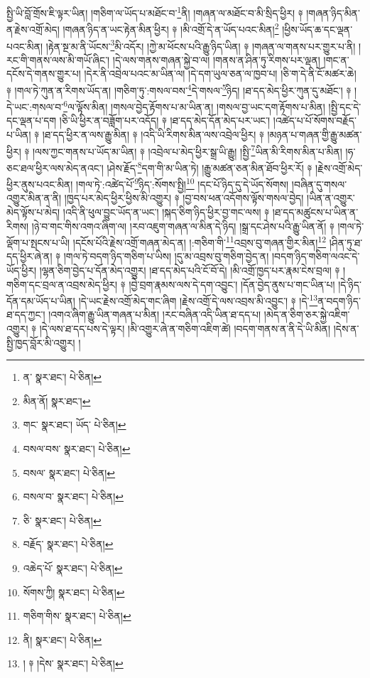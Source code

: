 སྤྱི་ཡི་བློ་གྲོས་ཇི་ལྟར་ཡིན། །གཅིག་ལ་ཡོད་པ་མཐོང་བ་\footnote{ན་  སྣར་ཐང་།  པེ་ཅིན། }ནི། །གཞན་ལ་མཐོང་བ་མི་སྲིད་ཕྱིར། ༈ །གཞན་ཉིད་མིན་ན་རྗེས་འགྲོ་མེད། །གཞན་ཉིད་ན་ཡང་རྟེན་མིན་ཕྱིར། ༈ །མི་འགྲོ་དེ་ན་ཡོད་པའང་མིན།\footnote{མིན་ནོ།  སྣར་ཐང་། } །ཕྱིས་ཡོད་ཆ་དང་ལྡན་པའང་མིན། །རྟེན་སྔ་མ་ནི་ཡོངས་\footnote{གང་  སྣར་ཐང་། ཡོད་  པེ་ཅིན། }མི་འདོར། །ཀྱེ་མ་ཕོངས་པའི་རྒྱུ་ཉིད་ཡིན། ༈ །གཞན་ལ་གནས་པར་གྱུར་པ་ནི། །རང་གི་གནས་ལས་མི་གཡོ་ཞིང་། །དེ་ལས་གནས་གཞན་སྐྱེ་བ་ལ། །གནས་ན་ཤིན་ཏུ་རིགས་པར་ལྡན། །གང་ན་དངོས་དེ་གནས་གྱུར་པ། །དེར་ནི་འབྲེལ་པའང་མ་ཡིན་ལ། །དེ་དག་ཡུལ་ཅན་ལ་ཁྱབ་པ། །ཅི་ག་དེ་ནི་ངོ་མཚར་ཆེ། ༈ །གལ་ཏེ་ཀུན་ན་རིགས་ཡོད་ན། །གཅིག་ཏུ་:གསལ་བས་\footnote{བསལ་བས་  སྣར་ཐང་།  པེ་ཅིན། }དེ་གསལ་\footnote{བསལ་  སྣར་ཐང་།  པེ་ཅིན། }ཉིད། །ཐ་དད་མེད་ཕྱིར་ཀུན་དུ་མཐོང་། ༈ །དེ་ཡང་:གསལ་བ་\footnote{བསལ་བ་  སྣར་ཐང་།  པེ་ཅིན། }ལ་ལྟོས་མིན། །གསལ་བྱེད་རྟོགས་པ་མ་ཡིན་ན། །གསལ་བྱ་ཡང་དག་རྟོགས་པ་མིན། །སྤྱི་དང་དེ་དང་ལྡན་པ་དག །ཅི་ཡི་ཕྱིར་ན་བཟློག་པར་འདོད། ༈ །ཐ་དད་མེད་དོན་མེད་པར་ཡང་། །འཚེད་པ་པོ་སོགས་བརྗོད་པ་ཡིན། ༈ །ཐ་དད་ཕྱིར་ན་ལས་རྒྱུ་མིན། ༈ །འདི་ཡི་རིགས་མིན་ལས་འབྲེལ་ཕྱིར། ༈ །མཉན་པ་གཞན་གྱི་རྒྱུ་མཚན་ཕྱིར། ༈ །ལས་ཀྱང་གནས་པ་ཡོད་མ་ཡིན། ༈ །འབྲེལ་པ་མེད་ཕྱིར་སྒྲ་ཡི་རྒྱུ། །སྤྱི་\footnote{ཅི་  སྣར་ཐང་།  པེ་ཅིན། }ཡིན་མི་རིགས་མིན་པ་མིན། །ཧ་ཅང་ཐལ་ཕྱིར་ལས་མེད་ནའང་། །ཤེས་རྗོད་\footnote{བརྗོད་  སྣར་ཐང་།  པེ་ཅིན། }དག་གི་མ་ཡིན་ཏེ། །རྒྱུ་མཚན་ཅན་མིན་ཐོབ་ཕྱིར་རོ། ༈ །རྗེས་འགྲོ་མེད་ཕྱིར་ནུས་པའང་མིན། །གལ་ཏེ་:འཚེད་པོ་\footnote{འཆེད་པོ་  སྣར་ཐང་།  པེ་ཅིན། }ཉིད་:སོགས་སྤྱི།\footnote{སོགས་ཀྱི།  སྣར་ཐང་།  པེ་ཅིན། } །དང་པོ་ཉིད་དུ་དེ་ཡོད་སོགས། །བཞིན་དུ་གསལ་འགྱུར་མིན་ན་ནི། །ཁྱད་པར་མེད་ཕྱིར་ཕྱིས་མི་འགྱུར། ༈ །བྱ་བས་ཕན་འདོགས་ལྟོས་གསལ་བྱེད། །ཡིན་ན་འགྱུར་མེད་ལྟོས་པ་མེད། །འདི་ནི་ཕུལ་བྱུང་ཡོད་ན་ཡང་། །སྐད་ཅིག་ཉིད་ཕྱིར་བྱ་གང་ལས། ༈ །ཐ་དད་མཚུངས་པ་ཡིན་ན་རིགས། །ཉེ་བ་གང་གིས་འགའ་ཞིག་ལ། །རབ་འཇུག་གཞན་ལ་མིན་དེ་ཉིད། །སྒྲ་དང་ཤེས་པའི་རྒྱུ་ཡིན་ནོ། ༈ །གལ་ཏེ་ལྡོག་པ་སྤངས་པ་ཡི། །དངོས་པོའི་རྗེས་འགྲོ་གཞན་མེད་ན། །:གཅིག་གི་\footnote{གཅིག་གིས་  སྣར་ཐང་།  པེ་ཅིན། }འབྲས་བུ་གཞན་གྱིར་མིན།\footnote{ནི།  སྣར་ཐང་།  པེ་ཅིན། } །ཤིན་ཏུ་ཐ་དད་ཕྱིར་ཞེ་ན། ༈ །གལ་ཏེ་བདག་ཉིད་གཅིག་པ་ཡིས། །དུ་མ་འབྲས་བུ་གཅིག་བྱེད་ན། །བདག་ཉིད་གཅིག་ལའང་དེ་ཡོད་ཕྱིར། །ལྷན་ཅིག་བྱེད་པ་དོན་མེད་འགྱུར། །ཐ་དད་མེད་པའི་ངོ་བོ་དེ། །མི་འགྲོ་ཁྱད་པར་རྣམ་ངེས་བྲལ། ༈ །གཅིག་དང་བྲལ་ན་འབྲས་མེད་ཕྱིར། ༈ །བྱེ་བྲག་རྣམས་ལས་དེ་དག་འབྱུང་། །དོན་བྱེད་ནུས་པ་གང་ཡིན་པ། །དེ་ཉིད་དོན་དམ་ཡོད་པ་ཡིན། །དེ་ཡང་རྗེས་འགྲོ་མེད་གང་ཞིག །རྗེས་འགྲོ་དེ་ལས་འབྲས་མི་འབྱུང་། ༈ །དེ་\footnote{། ༈ །དེས་  སྣར་ཐང་།  པེ་ཅིན། }ན་བདག་ཉིད་ཐ་དད་ཀྱང་། །འགའ་ཞིག་རྒྱུ་ཡིན་གཞན་པ་མིན། །རང་བཞིན་འདི་ཡིན་ཐ་དད་པ། །མེད་ན་ཅིག་ཅར་སྐྱེ་འཇིག་འགྱུར། ༈ །དེ་ལས་ཐ་དད་པས་དེ་ལྟར། །མི་འགྱུར་ཞེ་ན་གཅིག་འཇིག་ཚེ། །བདག་གནས་ན་ནི་དེ་ཡི་མིན། །དེས་ན་སྤྱི་ཁྱད་བློར་མི་འགྱུར། །
